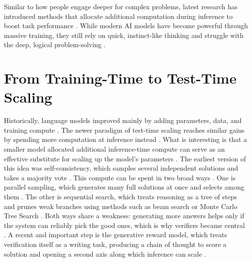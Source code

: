 \documentclass[12pt, a4paper, oneside]{report}
\begin{document}
Similar to how people engage deeper for complex problems, latest research has introduced methods that allocate additional computation during inference to boost task performance \parencite{Venktesh2025}. While modern AI models have become powerful through massive training, they still rely on quick, instinct-like thinking and struggle with the deep, logical problem-solving \parencite{Venktesh2025, Stechly2024}.


\section{From Training-Time to Test-Time Scaling}
Historically, language models improved mainly by adding parameters, data, and training compute \parencite{Snell2024, Zhang2025tts}. The newer paradigm of test-time scaling reaches similar gains by spending more computation at inference instead \parencite{Snell2024, Wan2026}. What is interesting is that a smaller model allocated additional inference-time compute can serve as an effective substitute for scaling up the model's parameters \parencite{Snell2024}. The earliest version of this idea was self-consistency, which samples several independent solutions and takes a majority vote \parencite{Singhi2025}. This compute can be spent in two broad ways \parencite{Zhang2025tts, Snell2024}. One is parallel sampling, which generates many full solutions at once and selects among them \parencite{Zhuang2026}. The other is sequential search, which treats reasoning as a tree of steps and prunes weak branches using methods such as beam search or Monte Carlo Tree Search \parencite{Snell2024, Zhao2025}. Both ways share a weakness: generating more answers helps only if the system can reliably pick the good ones, which is why verifiers became central \parencite{Venktesh2025, Wan2026}. A recent and important step is the generative reward model, which treats verification itself as a writing task, producing a chain of thought to score a solution and opening a second axis along which inference can scale \parencite{Singhi2025, Zhang2025tts, Khalifa2025}.
\end{document}
